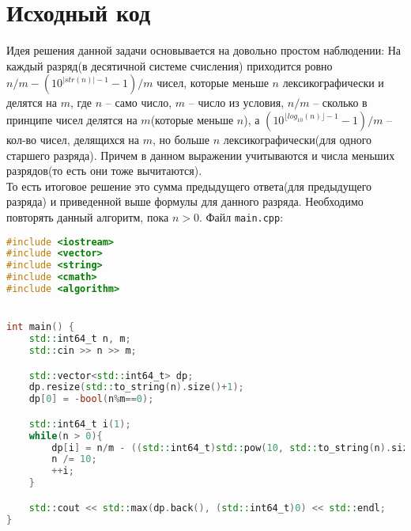 \section{Исходный код}
Идея решения данной задачи основывается на довольно простом наблюдении:
На каждый разряд(в десятичной системе счисления) приходится ровно $ n/m - (10^{|str(n)|-1} - 1) / m $ чисел, которые меньше $n$ лексикографически и делятся на $m$, где $n$ -- само число, $m$ -- число из условия,
$n/m$ -- сколько в принципе чисел делятся на $m$(которые меньше $n$), а $(10 ^ {\lfloor{}log_{10}(n)\rfloor{} - 1} - 1) / m$ -- кол-во чисел, делящихся на $m$, но больше $n$ лексикографически(для одного старшего разряда). Причем в данном выражении учитываются и числа меньших разрядов(то есть они тоже вычитаются).
\\
То есть итоговое решение это сумма предыдущего ответа(для предыдущего разряда) и приведенной выше формулы для данного разряда. Необходимо повторять данный алгоритм, пока $n > 0$.
Файл \texttt{main.cpp}:
\begin{lstlisting}[language=C++]
#include <iostream>
#include <vector>
#include <string>
#include <cmath>
#include <algorithm>


int main() {
    std::int64_t n, m;
    std::cin >> n >> m;

    std::vector<std::int64_t> dp;
    dp.resize(std::to_string(n).size()+1);
    dp[0] = -bool(n%m==0);

    std::int64_t i(1);
    while(n > 0){
        dp[i] = n/m - ((std::int64_t)std::pow(10, std::to_string(n).size()-1) - 1) / m + dp[i-1];
        n /= 10;
        ++i;
    }

    std::cout << std::max(dp.back(), (std::int64_t)0) << std::endl;
}
\end{lstlisting}


\pagebreak

